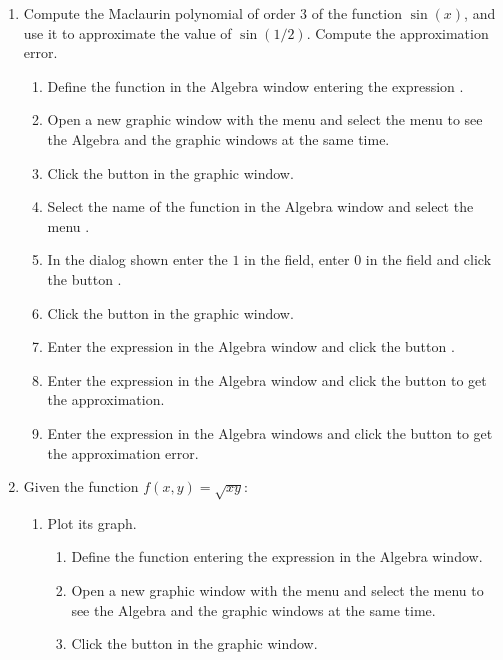 \begin{enumerate}[leftmargin=*]
\item Compute the Maclaurin polynomial of order 3 of the function $\sin(x)$, and use it to approximate the value of $\sin(1/2)$.
Compute the approximation error.

\begin{indication}
\begin{enumerate}
\item Define the function in the Algebra window entering the expression .
\item Open a new graphic window with the menu  and select the menu  to see the Algebra and the graphic windows at the same time.
\item Click the button  in the graphic window.
\item Select the name of the function in the Algebra window and select the menu .
\item In the dialog shown enter the $1$ in the  field, enter 0 in the  field and click the button .
\item Click the button  in the graphic window. 
\item Enter the expression  in the Algebra window and click the button .
\item Enter the expression  in the Algebra window and click the button  to get the approximation.
\item Enter the expression  in the Algebra windows and click the button  to get the approximation error.
\end{enumerate}
\end{indication}

\item Given the function $f(x,y)=\sqrt{xy}$:
\begin{enumerate}
\item Plot its graph.
\begin{indication}
\begin{enumerate}
\item Define the function entering the expression  in the Algebra window.
\item Open a new graphic window with the menu  and select the menu  to see the Algebra and the graphic windows at the same time.
\item Click the button  in the graphic window.
\end{enumerate}
\end{indication}


\end{enumerate}
\end{enumerate}
